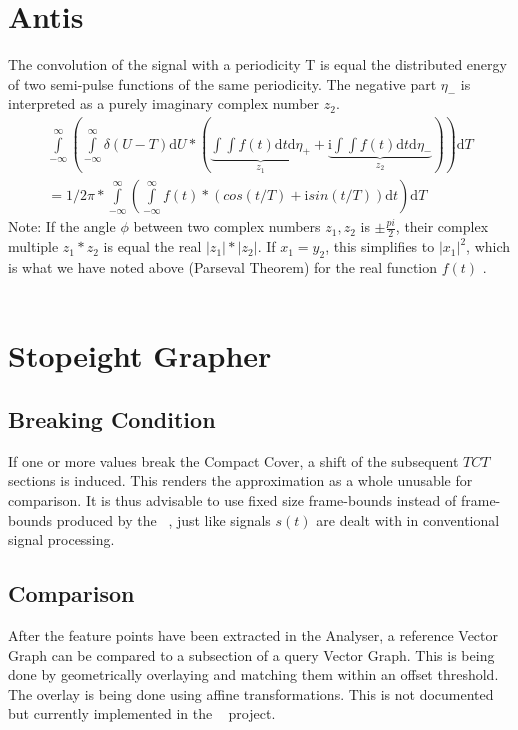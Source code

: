 \documentclass{report}
\begin{document}
\section{Antis}

The convolution of the signal with a periodicity T is equal the distributed energy of two semi-pulse functions of the same periodicity. The negative part $\eta_{-}$ is interpreted as a purely imaginary complex number $z_{2}$.
\begin{align*}
\int\limits_{-\infty}^{\infty}(\int\limits_{-\infty}^{\infty} \delta (U - T) \mathrm{d} U * (\underbrace{\int \int f(t) \mathrm{d} t \mathrm{d} \eta_{+}}_{z_{1}} + \underbrace{\mathrm{i} \int \int f(t) \mathrm{d} t \mathrm{d} \eta_{-}}_{z_{2}}))  \mathrm{d} T \\= 1/2\pi * \int\limits_{-\infty}^{\infty} ( \int\limits_{-\infty}^{\infty}  f(t) * (cos(t/T)+\mathrm{i} sin(t/T)) \mathrm{d} t ) \mathrm{d} T
\end{align*}
Note: If the angle $\phi$ between two complex numbers $z_{1},z_{2}$ is $\pm\frac{pi}{2}$, their complex multiple $z_{1}*z_{2}$ is equal the real $\lvert z_{1}\rvert*\lvert z_{2}\rvert$. If $x_{1}=y_{2}$, this simplifies to $\lvert x_{1} \rvert ^2$, which is what we have noted above (Parseval Theorem) for the real function $f(t)$ .\\\\


\section{Stopeight Grapher}

\subsection{Breaking Condition}
If one or more values break the Compact Cover, a shift of the subsequent $TCT$ sections is induced. This renders the approximation as a whole unusable for comparison. It is thus advisable to use fixed size frame-bounds instead of frame-bounds produced by the ~\cite[Stopeight\_Analyzer.tex]{Analyzer}, just like signals $s(t)$ are dealt with in conventional signal processing.

\subsection*{Comparison}
After the feature points have been extracted in the Analyser, a reference Vector Graph can be compared to a subsection of a query Vector Graph. This is being done by geometrically overlaying and matching them within an offset threshold. The overlay is being done using affine transformations. This is not documented but currently implemented in the ~\cite[Stopeight\_Comparator.tex]{Comparator} project.
\end{document}
